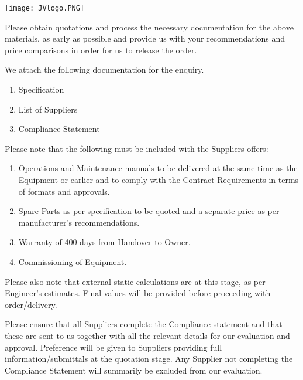 \documentclass[a4paper,11pt,oneside]{article}
\def\signature{%
 \YL\encl}
\begin{document}
\sffamily
\mbox{}
\texttt{[image: JVlogo.PNG]}
\vspace{1em}

\Date 


\TOMCD


\setlength{\parskip}{\baselineskip}


Please obtain quotations and process the necessary documentation for the above materials, as early as possible and provide us with your recommendations and price comparisons in order for us to release the order. 

We attach the following documentation for the enquiry. 

\begin{enumerate}

\item Specification
\item List of Suppliers
\item Compliance Statement
\end{enumerate}

Please note that the following must be included with the Suppliers offers:

\begin{enumerate}
\item  Operations and Maintenance manuals to be delivered at the same time as the Equipment or earlier and to comply with the Contract Requirements in terms of formats and approvals.
\item Spare Parts as per specification to be quoted and a separate price as per manufacturer's recommendations.
\item Warranty of 400 days from Handover to Owner.
\item Commissioning of Equipment.
\end{enumerate}

Please also note that external static calculations are at this stage, as per Engineer's estimates. Final values will be provided before proceeding with order/delivery.


Please ensure that all Suppliers complete the Compliance statement and that these are sent to us together with all the relevant details for our evaluation and approval. Preference will be given to Suppliers providing full information/submittals at the quotation stage. Any Supplier not completing the Compliance Statement will summarily be excluded from our evaluation.



\signature
\end{document}
